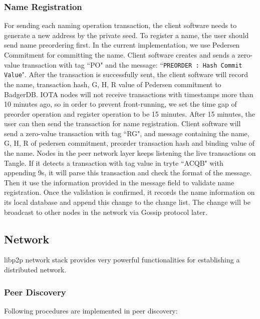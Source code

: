 \subsubsection{Name Registration} For sending each naming operation transaction, the client software needs to generate a new address by the private seed.
To register a name, the user should send name preordering first. In the current implementation, we use Pedersen Commitment \cite{pedersen1991non} for committing the name.
Client software creates and sends a zero-value transaction with tag ``PO" and the message: ``\texttt{PREORDER : \textlangle Hash Commit Value\textrangle}".
After the transaction is successfully sent, the client software will record the name, transaction hash, G, H, R value of Pedersen commitment to BadgerDB.
IOTA nodes will not receive transactions with timestamps more than 10 minutes ago, so in order to prevent front-running, we set the time gap of preorder operation and register operation to be 15 minutes.
After 15 minutes, the user can then send the transaction for name registration. Client software will send a zero-value transaction with tag ``RG", and message containing the name, G, H, R of pedersen commitment, preorder transaction hash and binding value of the name.
Nodes in the peer network layer keeps listening the live transactions on Tangle. If it detects a transaction with tag value in tryte ``ACQB" with appending 9s, it will parse this transaction and check the format of the message.
Then it use the information provided in the message field to validate name registration. Once the validation is confirmed, it records the name information on its local database and append this change to the change list.
The change will be broadcast to other nodes in the network via Gossip protocol later.

\subsection{Network}
libp2p network stack provides very powerful functionalities for establishing a distributed network.

\subsubsection{Peer Discovery}
Following procedures are implemented in peer discovery:

